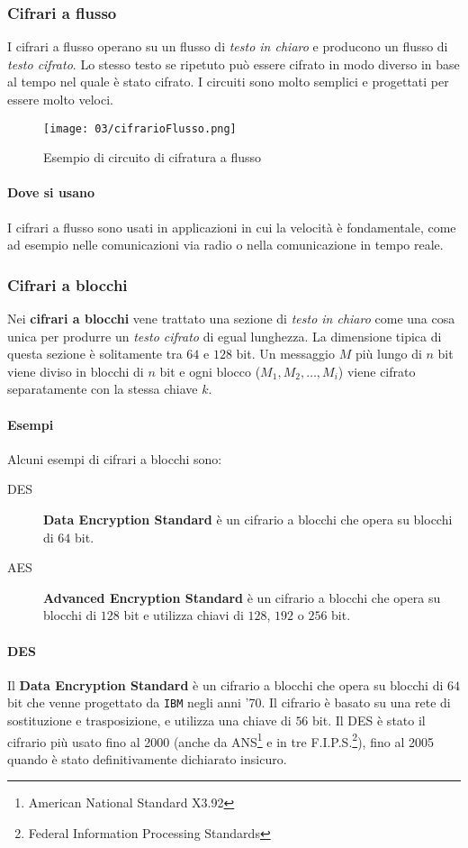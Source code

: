         \subsubsection{Cifrari a flusso}
            I cifrari a flusso operano su un flusso di \textit{testo in chiaro} e producono un flusso di \textit{testo cifrato}. Lo stesso testo se ripetuto può essere cifrato in modo diverso in base al tempo nel quale è stato cifrato. I circuiti sono molto semplici e progettati per essere molto veloci.
            \begin{figure}[H]
                \centering
                \texttt{[image: 03/cifrarioFlusso.png]}
                \caption{Esempio di circuito di cifratura a flusso}
            \end{figure}
            \paragraph{Dove si usano} I cifrari a flusso sono usati in applicazioni in cui la velocità è fondamentale, come ad esempio nelle comunicazioni via radio o nella comunicazione in tempo reale.
        \subsubsection{Cifrari a blocchi}
            Nei \textbf{cifrari a blocchi} vene trattato una sezione di \textit{testo in chiaro} come una cosa unica per produrre un \textit{testo cifrato} di egual lunghezza. La dimensione tipica di questa sezione è solitamente tra $64$ e $128$ bit. Un messaggio $M$ più lungo di $n$ bit viene diviso in blocchi di $n$ bit e ogni blocco ($M_1, M_2, \dots, M_i$) viene cifrato separatamente con la stessa chiave $k$.
            \paragraph{Esempi} Alcuni esempi di cifrari a blocchi sono:
            \begin{description}
                \item[DES] \textbf{Data Encryption Standard} è un cifrario a blocchi che opera su blocchi di $64$ bit.
                \item[AES] \textbf{Advanced Encryption Standard} è un cifrario a blocchi che opera su blocchi di $128$ bit e utilizza chiavi di $128$, $192$ o $256$ bit.
            \end{description}
            \paragraph{DES}
                Il \textbf{Data Encryption Standard} è un cifrario a blocchi che opera su blocchi di $64$ bit che venne progettato da \texttt{IBM} negli anni '70. Il cifrario è basato su una rete di sostituzione e trasposizione, e utilizza una chiave di $56$ bit. Il DES è stato il cifrario più usato fino al 2000 (anche da ANS\footnote{American National Standard X3.92} e in tre F.I.P.S.\footnote{Federal Information Processing Standards}), fino al 2005 quando è stato definitivamente dichiarato insicuro.
